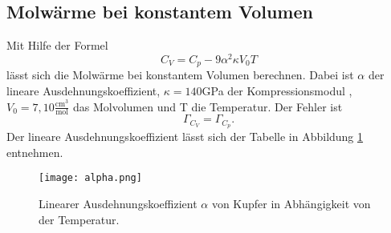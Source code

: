 

\subsection{Molwärme bei konstantem Volumen}
Mit Hilfe der Formel
\begin{equation}
  C_V = C_p - 9\alpha^2\kappa{V_0}T
\end{equation}
lässt sich die Molwärme bei konstantem Volumen berechnen.
Dabei ist $\alpha$ der lineare Ausdehnungskoeffizient, $\kappa = 140$GPa der Kompressionsmodul \cite{kappa}, $V_0 = 7,10\frac{\text{cm}^3}{\text{mol}}$ das Molvolumen \cite{cu} und T die Temperatur.
Der Fehler ist
\begin{equation}
  \Gamma_{C_V} = \Gamma_{C_p}.
\end{equation}
Der lineare Ausdehnungskoeffizient lässt sich der Tabelle in Abbildung \ref{alpha} entnehmen.

\begin{figure}[H]
  \centering
  \texttt{[image: alpha.png]}
  \caption{Linearer Ausdehnungskoeffizient $\alpha$ von Kupfer in Abhängigkeit von der Temperatur. \cite{skript}}
  \label{alpha}
\end{figure}

